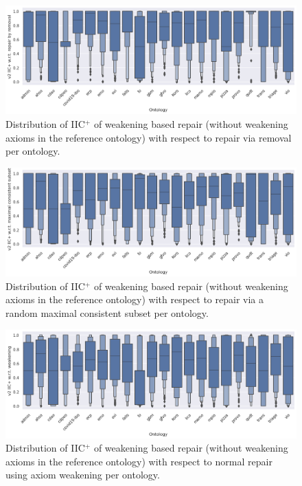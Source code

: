 \begin{figure}[htbp]
  \centering
  \includegraphics[width=\textwidth]{resources/eiic-enhance-rem-ontology-violin.png}
  \caption{Distribution of IIC$^+$ of weakening based repair (without weakening axioms in the reference ontology) with respect to repair via removal per ontology.}
\end{figure}

\begin{figure}[htbp]
  \centering
  \includegraphics[width=\textwidth]{resources/eiic-enhance-ontology-violin.png}
  \caption{Distribution of IIC$^+$ of weakening based repair (without weakening axioms in the reference ontology) with respect to repair via a random maximal consistent subset per ontology.}
\end{figure}

\begin{figure}[htbp]
  \centering
  \includegraphics[width=\textwidth]{resources/eiic-enhance-weaken-ontology-violin.png}
  \caption{Distribution of IIC$^+$ of weakening based repair (without weakening axioms in the reference ontology) with respect to normal repair using axiom weakening per ontology.}
\end{figure}

